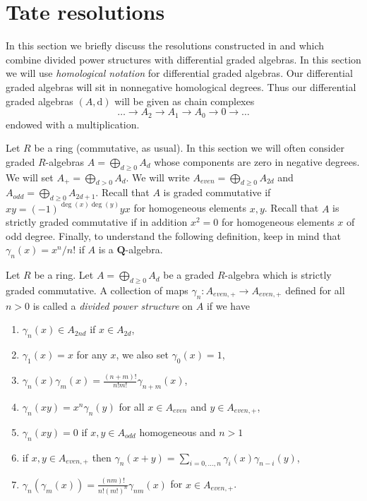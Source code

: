 \section{Tate resolutions}
\label{section-tate}

\noindent
In this section we briefly discuss the resolutions constructed in
\cite{Tate-homology} and \cite{AH}
which combine divided power structures with
differential graded algebras.
In this section we will use {\it homological notation} for
differential graded algebras.
Our differential graded algebras will sit in nonnegative homological
degrees. Thus our differential graded algebras $(A, \text{d})$
will be given as chain complexes
$$
\ldots \to A_2 \to A_1 \to A_0 \to 0 \to \ldots
$$
endowed with a multiplication.

\medskip\noindent
Let $R$ be a ring (commutative, as usual).
In this section we will often consider graded
$R$-algebras $A = \bigoplus_{d \geq 0} A_d$ whose components are
zero in negative degrees. We will set $A_+ = \bigoplus_{d > 0} A_d$.
We will write $A_{even} = \bigoplus_{d \geq 0} A_{2d}$ and
$A_{odd} = \bigoplus_{d \geq 0} A_{2d + 1}$.
Recall that $A$ is graded commutative if
$x y = (-1)^{\deg(x)\deg(y)} y x$ for homogeneous elements $x, y$.
Recall that $A$ is strictly graded commutative if in addition
$x^2 = 0$ for homogeneous elements $x$ of odd degree. Finally, to understand
the following definition, keep in mind that $\gamma_n(x) = x^n/n!$
if $A$ is a $\mathbf{Q}$-algebra.

\begin{definition}
\label{definition-divided-powers-graded}
Let $R$ be a ring. Let $A = \bigoplus_{d \geq 0} A_d$ be a graded
$R$-algebra which is strictly graded commutative. A collection of maps
$\gamma_n : A_{even, +} \to A_{even, +}$ defined for all $n > 0$ is called
a {\it divided power structure} on $A$ if we have
\begin{enumerate}
\item $\gamma_n(x) \in A_{2nd}$ if $x \in A_{2d}$,
\item $\gamma_1(x) = x$ for any $x$, we also set $\gamma_0(x) = 1$,
\item $\gamma_n(x)\gamma_m(x) = \frac{(n + m)!}{n! m!} \gamma_{n + m}(x)$,
\item $\gamma_n(xy) = x^n \gamma_n(y)$ for all $x \in A_{even}$ and
$y \in A_{even, +}$,
\item $\gamma_n(xy) = 0$ if $x, y \in A_{odd}$ homogeneous and $n > 1$
\item if $x, y \in A_{even, +}$ then
$\gamma_n(x + y) = \sum_{i = 0, \ldots, n} \gamma_i(x)\gamma_{n - i}(y)$,
\item $\gamma_n(\gamma_m(x)) =
\frac{(nm)!}{n! (m!)^n} \gamma_{nm}(x)$ for $x \in A_{even, +}$.
\end{enumerate}
\end{definition}

